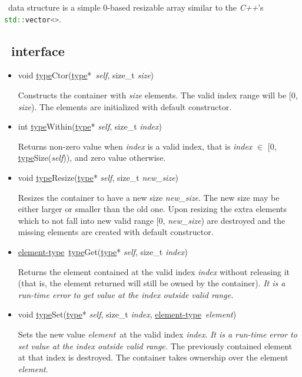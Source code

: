 \documentclass[a4paper]{article}
\newcommand{\Cpp}{\emph{C++}}
\newcommand{\st}{\underline{type}}
\newcommand{\et}{\underline{element-type}}
\newcommand{\sv}{\emph{self}}
\newcommand{\ev}{\emph{element}}
\newcommand{\meth}[1]{#1}
\begin{document}
\Vector\ data structure is a simple 0-based resizable array similar to the \Cpp's \lstinline[language=C++]{std::vector<>}.


\subsection{\Vector\ interface}


\begin{itemize}


\item \meth{void \st Ctor(\st*\ \sv, size\_t \emph{size})}


Constructs the container with \emph{size} elements.
The valid index range will be [0, \emph{size}).
The elements are initialized with default constructor.


\commonmethods


\item \meth{int \st Within(\st* \sv, size\_t \emph{index})}


Returns non-zero value when \emph{index} is a valid index, that is \emph{index} $\in$ [0, \meth{\st Size(\sv)}), and zero value otherwise.


\item \meth{void \st Resize(\st* \sv, size\_t \emph{new\_size})}


Resizes the container to have a new size \emph{new\_size}.
The new size may be either larger or smaller than the old one.
Upon resizing the extra elements which to not fall into new valid range [0, \emph{new\_size}) are destroyed and the missing elements are created with default constructor.


\item \meth{\et\ \st Get(\st* \sv, size\_t \emph{index})}


Returns the element contained at the valid index \emph{index} without releasing it (that is, the element returned will still be owned by the container).
\emph{It is a run-time error to get value at the index outside valid range.}


\item \meth{void \st Set(\st* \sv, size\_t \emph{index}, \et\ \ev)}


Sets the new value \ev\ at the valid index \emph{index}.
\emph{It is a run-time error to set value at the index outside valid range.}
The previously contained element at that index is destroyed.
The container takes ownership over the element \ev.


\end{itemize}
\end{document}
